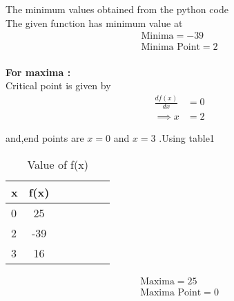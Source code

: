 \documentclass[journal,10pt,twocolumn]{article}
\begin{document}
The minimum values obtained from the python code \vspace{5mm}\\
The given function has minimum value at
\begin{align}
        \boxed{\text{Minima} = -39}\\
        \boxed{\text{Minima Point} = 2}
    \end{align}
\\
\textbf{For maxima :}
\\
 Critical point is given by
    \begin{align}
       \frac{df(x)}{dx} &= 0 \\
        \implies x &= 2
    \end{align}
    
    and,end points are $x=0$ and $x=3$ .Using table1
    \begin{table}[htbp]
 \begin{center}
    \begin{tabular}{|l|c|c|c|c|c|c} \hline \textbf{x}
  & \textbf{f(x)} \\
 \hline
0 &25\\ \hline
2&-39 \\ \hline
3 &16  \\ \hline	
\end{tabular}   
\end{center}
\caption{Value of f(x)}
\end{table}

 \begin{align}
        \boxed{\text{Maxima} = 25}\\
        \boxed{\text{Maxima Point} = 0}
    \end{align}
   
\end{document}
